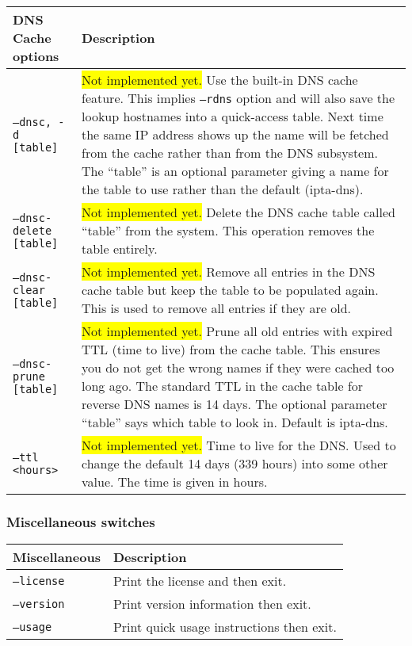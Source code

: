 \documentclass[english,twoside,openright,a4paper,12pt]{article}
\newcommand{\hilight}[1]{\colorbox{yellow}{#1}}
\begin{document}
\scriptsize
\begin{longtable}{|p{}|p{}|}
\hline
\textbf{DNS Cache options} & \textbf{Description}\\ \hline
	
\texttt{--dnsc, -d [table]} & \hilight{Not implemented yet.} Use the
built-in DNS cache feature. This implies \texttt{--rdns} option and
will also save the lookup hostnames into a quick-access table. Next
time the same IP address shows up the name will be fetched from the
cache rather than from the DNS subsystem. The ``table'' is an optional
parameter giving a name for the table to use rather than the default
(ipta-dns).\\\hline
	
\texttt{--dnsc-delete [table]} & \hilight{Not implemented yet.} Delete
the DNS cache table called ``table'' from the system. This operation
removes the table entirely.\\\hline
	
\texttt{--dnsc-clear [table]} & \hilight{Not implemented yet.} Remove
all entries in the DNS cache table but keep the table to be populated
again. This is used to remove all entries if they are old.\\\hline
	
\texttt{--dnsc-prune [table]} & \hilight{Not implemented yet.} Prune
all old entries with expired TTL (time to live) from the cache table.
This ensures you do not get the wrong names if they were cached too
long ago. The standard TTL in the cache table for reverse DNS names is
14 days. The optional parameter ``table'' says which table to look in.
Default is ipta-dns.\\\hline
	
\texttt{--ttl <hours>} & \hilight{Not implemented yet.} Time to live
for the DNS. Used to change the default 14 days (339 hours) into some
other value. The time is given in hours.\\\hline
\end{longtable}
\normalsize

\subsubsection{Miscellaneous switches}

\scriptsize
\begin{longtable}{|p{}|p{}|}
\hline
\textbf{Miscellaneous} & \textbf{Description}\\ \hline

\texttt{--license} &
Print the license and then exit.\\\hline

\texttt{--version} &
Print version information then exit.\\\hline

\texttt{--usage} &
Print quick usage instructions then exit.\\\hline

\end{longtable}
\normalsize
\end{document}
